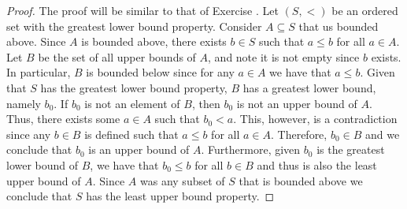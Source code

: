 \documentclass[12pt]{article}
\begin{document}
\begin{enumerate}[label=(\alph*)]
\begin{proof}
		The proof will be similar to that of Exercise . Let $(S,<)$ be an ordered set
		with the greatest lower bound property. Consider $A \subseteq S$ that us bounded above.
		Since $A$ is bounded above, there exists $b \in S$ such that $a \leq b$ for all $a \in A$.
		Let $B$ be the set of all upper bounds of $A$, and note it is not empty since $b$ exists.
		In particular, $B$ is bounded below since for any $a \in A$ we have that $a \leq b$.
		Given that $S$ has the greatest lower bound property, $B$ has a greatest lower bound,
		namely $b_0$. If $b_0$ is not an element of $B$, then $b_0$ is not an upper bound of $A$. 
		Thus, there exists some $a \in A$ such that $b_0 < a$. This, however, is 
		a contradiction since any $b \in B$ is defined such that $a \leq b$ for all $a \in A$. 
		Therefore, $b_0 \in B$ and we conclude that $b_0$ is an upper bound of $A$. Furthermore, given
		$b_0$ is the greatest lower bound of $B$, we have that $b_0 \leq b$ for all $b \in B$ and thus
		is also the least upper bound of $A$. Since $A$ was any subset of $S$ that is bounded
		above we conclude that $S$ has the least upper bound property.
	\end{proof}
\end{enumerate}
\end{document}
